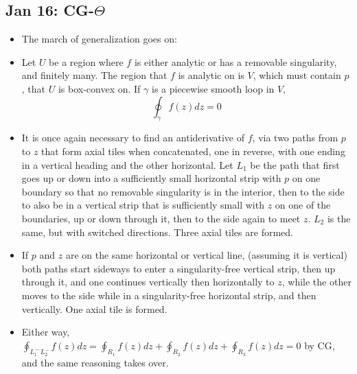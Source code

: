 \documentclass[10pt, oneside]{article}
\newcommand{\cat}{^{\,\smallfrown}}
\begin{document}
\subsection{Jan 16: CG-$\Theta$}
\begin{itemize}
    \item The march of generalization goes on:
    \item Let $U$ be a region where $f$ is either analytic or has a removable singularity, and finitely many. The region that $f$ is analytic on is $V$, which must contain $p$, that $U$ is box-convex on. If $\gamma$ is a piecewise smooth loop in $V$,
        \[\oint_\gamma f(z) dz = 0\]
    \item It is once again necessary to find an antiderivative of $f$, via two paths from $p$ to $z$ that form axial tiles when concatenated, one in reverse, with one ending in a vertical heading and the other horizontal. Let $L_1$ be the path that first goes up or down into a sufficiently small horizontal strip with $p$ on one boundary so that no removable singularity is in the interior, then to the side to also be in a vertical strip that is sufficiently small with $z$ on one of the boundaries, up or down through it, then to the side again to meet $z$. $L_2$ is the same, but with switched directions. Three axial tiles are formed.
    \item If $p$ and $z$ are on the same horizontal or vertical line, (assuming it is vertical) both paths start sideways to enter a singularity-free vertical strip, then up through it, and one continues vertically then horizontally to $z$, while the other moves to the side while in a singularity-free horizontal strip, and then vertically. One axial tile is formed.
    \item Either way, $\oint_{L_1 \cat L_2^-} f(z) dz = \oint_{R_1} f(z) dz + \oint_{R_2} f(z) dz + \oint_{R_3} f(z) dz = 0$ by CG, and the same reasoning takes over.
\end{itemize}
\end{document}
